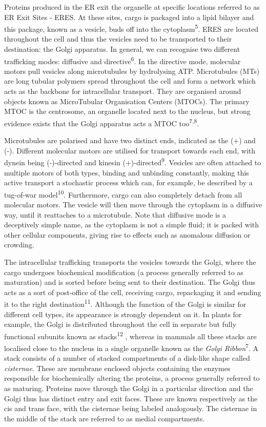 \documentclass{Dissertate}
\begin{document}
Proteins produced in the ER exit the organelle at specific locations
referred to as ER Exit Sites - ERES. At these sites, cargo is packaged
into a lipid bilayer and this package, known as a vesicle, buds off into
the cytoplasm\textsuperscript{5}. ERES are located throughout the cell
and thus the vesicles need to be transported to their destination: the
Golgi apparatus. In general, we can recognise two different trafficking
modes: diffusive and directive\textsuperscript{6}. In the directive
mode, molecular motors pull vesicles along microtubules by hydrolysing
ATP. Microtubules (MTs) are long tubular polymers spread throughout the
cell and form a network which acts as the backbone for intracellular
transport. They are organised around objects known as MicroTubular
Organisation Centers (MTOCs). The primary MTOC is the centrosome, an
organelle located next to the nucleus, but strong evidence exists that
the Golgi apparatus acts a MTOC
too\textsuperscript{7,8}.

Microtubules are polarised and have two distinct ends, indicated as the
(+) and (-). Different molecular motors are utilised for transport
towards each end, with dynein being (-)-directed and kinesin
(+)-directed\textsuperscript{9}. Vesicles are often attached to multiple
motors of both types, binding and unbinding constantly, making this
active transport a stochastic process which can, for example, be
described by a tug-of-war model\textsuperscript{10}. Furthermore, cargo
can also completely detach from all molecular motors. The vesicle will
then move through the cytoplasm in a diffusive way, until it reattaches
to a microtubule. Note that diffusive mode is a deceptively simple name,
as the cytoplasm is not a simple fluid; it is packed with other cellular
components, giving rise to effects such as anomalous diffusion or
crowding.

The intracellular trafficking transports the vesicles towards the Golgi,
where the cargo undergoes biochemical modification (a process generally referred to as maturation) and is sorted before
being sent to their destination. The Golgi thus acts as a sort of
post-office of the cell, receiving cargo, repackaging it and sending it to
the right destination\textsuperscript{11}. Although the function of the
Golgi is similar for different cell types, its appearance is strongly
dependent on it. In plants for example, the Golgi is distributed
throughout the cell in separate but fully functional subunits known as
stacks\textsuperscript{12} , whereas in mammals all these stacks are
localised close to the nucleus in a single organelle known as the
\emph{Golgi Ribbon}\textsuperscript{7}. A stack consists of a number of
stacked compartments of a disk-like shape called \emph{cisternae}. These
are membrane enclosed objects containing the enzymes responsible for
biochemically altering the proteins, a process generally referred to as
maturing. Proteins move through the Golgi in a particular direction and
the Golgi thus has distinct entry and exit faces. These are known
respectively as the cis and trans face, with the cisternae being labeled
analogously. The cisternae in the middle of the stack are referred to as
medial compartments.
\end{document}
